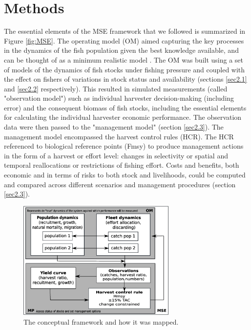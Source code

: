 \documentclass[12pt,oneline,a4paper,numbib]{ouparticle}
\numberwithin{equation}{subsection} %
\begin{document}


\section{Methods}
\label{sec2}

The essential elements of the MSE framework that we followed is summarized in Figure \ref{fig:MSE}. The operating model (OM) aimed capturing the key processes in the dynamics of the fish population given the best knowledge available, and can be thought of as a minimum realistic model \cite{Punt1995}. The OM was built using a set of models of the dynamics of fish stocks under fishing pressure and coupled with the effect on fishers of variations in stock status and availability (sections \ref{sec2.1} and \ref{sec2.2} respectively). This resulted in simulated measurements (called "observation model") such as individual harvester decision-making (including error) and the consequent biomass of fish stocks, including the essential elements for calculating the individual harvester economic performance. The observation data were then passed to the "management model" (section \ref{sec2.3}). The management model encompassed the harvest control rules (HCR). The HCR referenced to biological reference points (Fmsy) to produce management actions in the form of a harvest or effort level: changes in selectivity or spatial and temporal reallocations or restrictions of fishing effort. Costs and benefits, both economic and in terms of risks to both stock and livelihoods, could be computed and compared across different scenarios and management procedures (section \ref{sec2.3}).

 
\begin{figure}[!h]
\centering
\includegraphics[width=0.7\textwidth]{Figures/MSE.eps} 
\caption{The conceptual framework and how it was mapped.}
\end{figure}
\end{document}
